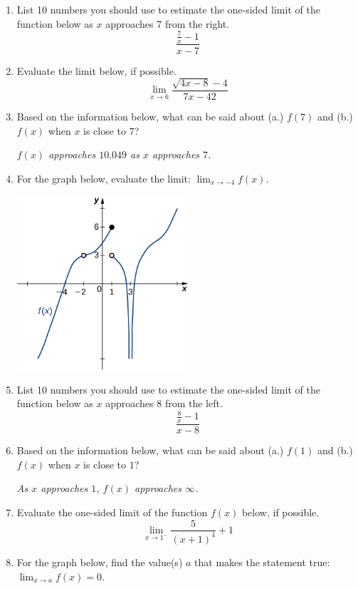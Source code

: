 \documentclass[14pt]{extbook}
\begin{document}
\begin{enumerate}
\item{
List 10 numbers you should use to estimate the one-sided limit of the function below as $x$ approaches 7 from the right.\[ \frac{\frac{7}{x} - 1}{x - 7} \]} \newpage
\item{
Evaluate the limit below, if possible.\[ \lim_{x \rightarrow 6} \frac{\sqrt{4x - 8} - 4}{7x - 42} \]} \newpage
\item{
Based on the information below, what can be said about (a.) $f(7)$ and (b.) $f(x)$ when $x$ is close to $7$?
\begin{center}
    \textit{ $f(x)$ approaches $10.049$ as $x$ approaches $7$. }
\end{center}
} \newpage
\item{
For the graph below, evaluate the limit: $ \displaystyle \lim_{x \rightarrow -4} f(x)$.
\begin{center}
    \includegraphics[width=0.5\textwidth]{../Figures/evaluateLimitGraphicallyB.png}
\end{center}
} \newpage
\item{
List 10 numbers you should use to estimate the one-sided limit of the function below as $x$ approaches 8 from the left.\[ \frac{\frac{8}{x} - 1}{x - 8} \]} \newpage
\item{
Based on the information below, what can be said about (a.) $f(1)$ and (b.) $f(x)$ when $x$ is close to $1$?
\begin{center}
    \textit{ As $x$ approaches $1$, $f(x)$ approaches $\infty$. }
\end{center}
} \newpage
\item{
Evaluate the one-sided limit of the function $f(x)$ below, if possible.\[ \lim_{x \rightarrow 1^-} \frac{5}{(x+1)^4}+1 \]} \newpage
\item{
For the graph below, find the value(s) $a$ that makes the statement true: $ \displaystyle \lim_{x \rightarrow a} f(x) = 0$.
}
\end{enumerate}
\end{document}
